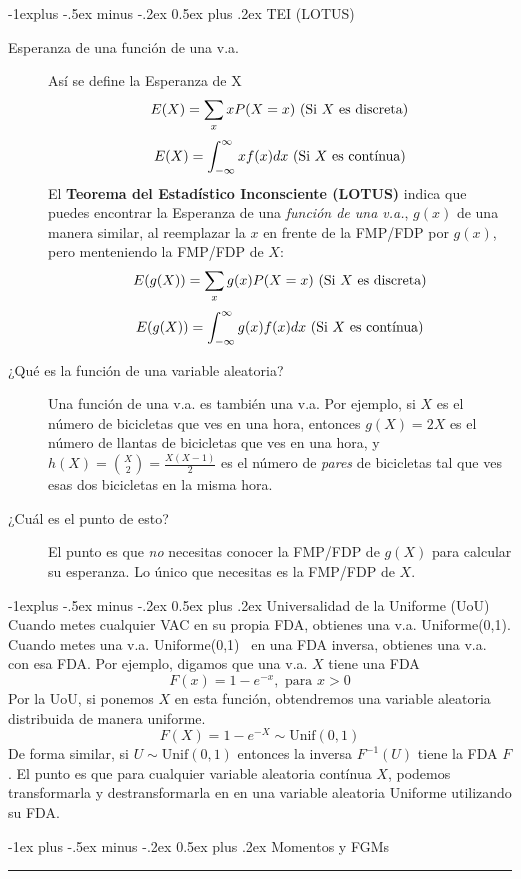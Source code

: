 \documentclass[12,landscape]{article}
\makeatletter
\renewcommand{\section}{\@startsection{section}{1}{0mm}%
                                {-1ex plus -.5ex minus -.2ex}%
                                {0.5ex plus .2ex}%
                                {\normalfont\large\bfseries}}
\renewcommand{\subsection}{\@startsection{subsection}{2}{0mm}%
                                {-1explus -.5ex minus -.2ex}%
                                {0.5ex plus .2ex}%
                                {\normalfont\normalsize\bfseries}}
\makeatother
\begin{document}
\begin{multicols*}{3}
\subsection{TEI (LOTUS)}
\begin{description}
\item[Esperanza de una función de una v.a.]
Así se define la Esperanza de X
\[E(X) = \sum_x xP(X=x) \textnormal{ (Si $X$ es discreta)}\]
\[E(X) = \int^\infty_{-\infty}xf(x)dx  \textnormal{ (Si $X$ es contínua)}\]
El \textbf{Teorema del Estadístico Inconsciente (LOTUS)} indica que puedes encontrar la Esperanza de una \emph{función de una v.a.}, $g(x)$ de una manera similar, al reemplazar la $x$ en frente de la FMP/FDP por $g(x)$, pero menteniendo la FMP/FDP de $X$:
\[E(g(X)) = \sum_x g(x)P(X=x) \textnormal{ (Si $X$ es discreta)}\]
\[E(g(X)) = \int^\infty_{-\infty}g(x)f(x)dx \textnormal{ (Si $X$ es contínua)}\]
\item[¿Qué es la función de una variable aleatoria?] Una función de una v.a. es también una v.a. Por ejemplo, si $X$ es el número de bicicletas que ves en una hora, entonces $g(X) = 2X$ es el número de llantas de bicicletas que ves en una hora, y $h(X) = {X \choose 2} = \frac{X(X-1)}{2}$ es el número de \emph{pares} de bicicletas tal que ves esas dos bicicletas en la misma hora.
\item[¿Cuál es el punto de esto?] El punto es que \emph{no} necesitas conocer la FMP/FDP de $g(X)$ para calcular su esperanza. Lo único que necesitas es la FMP/FDP de $X$.
\end{description}

\subsection{Universalidad de la Uniforme (UoU)} Cuando metes cualquier VAC en su propia FDA, obtienes una v.a. Uniforme(0,1). Cuando metes una v.a. Uniforme(0,1) ~en una FDA inversa, obtienes una v.a. con esa FDA. Por ejemplo, digamos que una v.a. $X$ tiene una FDA
    \[ F(x) = 1 - e^{-x}, \textrm{ para $x>0$} \]
    Por la UoU, si ponemos $X$ en esta función, obtendremos una variable aleatoria distribuida de manera uniforme.
    \[ F(X) = 1 - e^{-X} \sim \textrm{Unif}(0,1)\]
    De forma similar, si $U \sim \textrm {Unif}(0,1)$ entonces la inversa $F^{-1}(U)$ tiene la FDA $F$. El punto es que para cualquier variable aleatoria contínua $X$, podemos transformarla y destransformarla en en una variable aleatoria Uniforme utilizando su FDA.

\section{Momentos y FGMs}\smallskip \hrule height 2pt \smallskip


\end{multicols*}
\end{document}
